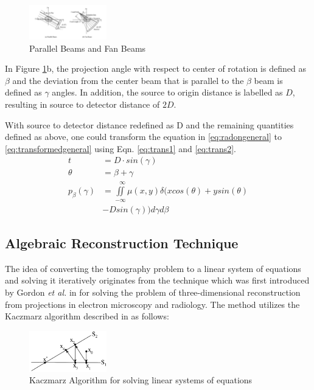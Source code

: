 \documentclass[journal]{IEEEtran}
\begin{document}
\begin{figure}[h]
\centering
\includegraphics[width=0.3\textwidth]{images/PvsB.jpg}
\caption{Parallel Beams and Fan Beams \cite{zeng2017image}}\label{fig:PvsB}
\end{figure}

In Figure \ref{fig:PvsB}b, the projection angle with respect to center of rotation is defined as $\beta$ and the deviation from the center beam that is parallel to the $\beta$ beam is defined as $\gamma$ angles. In addition, the source to origin distance is labelled as $D$, resulting in source to detector distance of $2D$. 

With source to detector distance redefined as D and the remaining quantities defined as above, one could transform the equation in \ref{eq:radongeneral} to \ref{eq:transformedgeneral} using Eqn. \ref{eq:trans1} and \ref{eq:trans2}.
\begin{align}
	t &= D \cdot sin(\gamma) \label{eq:trans1} \\
	\theta &= \beta + \gamma \label{eq:trans2} \\
	p_{\beta}(\gamma) &= \iint\limits_{-\infty}^{\ \ \ \infty}\mu(x,y)\delta(xcos(\theta)+ysin(\theta) \label{eq:transformedgeneral} \\&-Dsin(\gamma))d\gamma d\beta \nonumber 
\end{align}

\subsection{Algebraic Reconstruction Technique}
The idea of converting the tomography problem to a linear system of equations and solving it iteratively originates from the technique which was first introduced by Gordon \textit{et al.} in \cite{gordon1970algebraic} for solving the problem of three-dimensional reconstruction from projections in electron microscopy and radiology. The method utilizes the Kaczmarz algorithm described in \cite*{kaczmarz1993approximate} as follows:

\begin{figure}[h]
\centering
\includegraphics[width=0.3\textwidth]{images/Graphical-representation-of-the-Kaczmarzs-algorithm.png}
\caption{Kaczmarz Algorithm for solving linear systems of equations}\label{fig:kaczmarz}
\end{figure}
\end{document}

